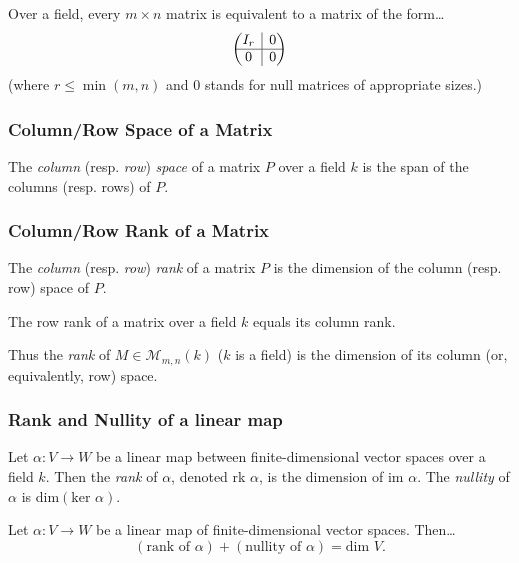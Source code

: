 \begin{proposition}
Over a field, every $m \times n$ matrix is equivalent to a matrix of the form\dots
\[
	\begin{pmatrix}
		I_r & \rvline & 0 \\
		\hline
		0 & \rvline & 0 \\
	\end{pmatrix}
\]
(where $r \leq \min(m,n)$ and $0$ stands for null matrices of appropriate sizes.)
\end{proposition}

\subsubsection{Column/Row Space of a Matrix}\label{spaceofmatrix}
The \emph{column} (resp. \emph{row}) \emph{space} of a matrix $P$ over a field $k$ is the span of the columns (resp. rows) of $P$.

\subsubsection{Column/Row Rank of a Matrix}\label{rankofmatrix}
The \emph{column} (resp. \emph{row}) \emph{rank} of a matrix $P$ is the dimension of the column (resp. row) space of $P$.

\begin{proposition}
The row rank of a matrix over a field $k$ equals its column rank.
\end{proposition}

\noindent Thus the \emph{rank} of $M \in \mathcal{M}_{m,n}(k)$ ($k$ is a field) is the dimension of its column (or, equivalently, row) space.

\subsubsection{Rank and Nullity of a linear map}
Let $\alpha: V \rightarrow W$ be a linear map between finite-dimensional vector spaces over a field $k$. Then the \emph{rank} of $\alpha$,
denoted rk $\alpha$, is the dimension of im $\alpha$. The \emph{nullity} of $\alpha$ is dim$(\textrm{ker }\alpha)$.

\begin{proposition}
Let $\alpha : V \rightarrow W$ be a linear map of finite-dimensional vector spaces. Then\dots
$$(\textrm{rank of }\alpha) + (\textrm{nullity of }\alpha) = \textrm{dim }V.$$
\end{proposition}